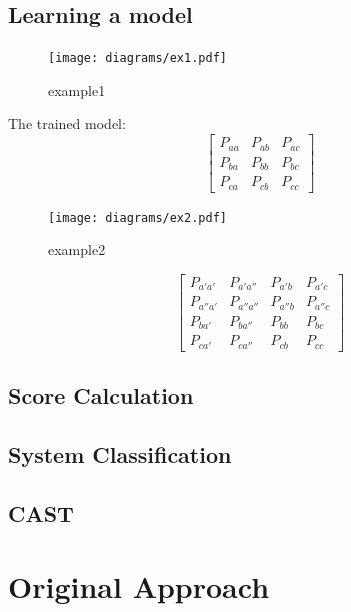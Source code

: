 \documentclass[11pt, a4paper]{report}
\begin{document}
\section{Learning a model}


\begin{figure}
  \texttt{[image: diagrams/ex1.pdf]}
  \caption{example1}
  \label{fig:ex1}
\end{figure}

The trained model:
\[
\begin{bmatrix}
  P_{aa} & P_{ab} & P_{ac}\\
  P_{ba} & P_{bb} & P_{bc}\\
  P_{ca} & P_{cb} & P_{cc}
\end{bmatrix}
\]

\begin{figure}
  \texttt{[image: diagrams/ex2.pdf]}
  \caption{example2}
  \label{fig:ex2}
\end{figure}
\[
\begin{bmatrix}
  P_{a'a'}  & P_{a'a''}  & P_{a'b}  & P_{a'c}\\
  P_{a''a'} & P_{a''a''} & P_{a''b} & P_{a''c}\\
  P_{ba'}   & P_{ba''}   & P_{bb}   & P_{bc}\\
  P_{ca'}   & P_{ca''}   & P_{cb}   &  P_{cc}
\end{bmatrix}
\]

\section{Score Calculation}
\section{System Classification}
\section{CAST}



\chapter{Original Approach}
\label{cha:orig-approach}
\end{document}
